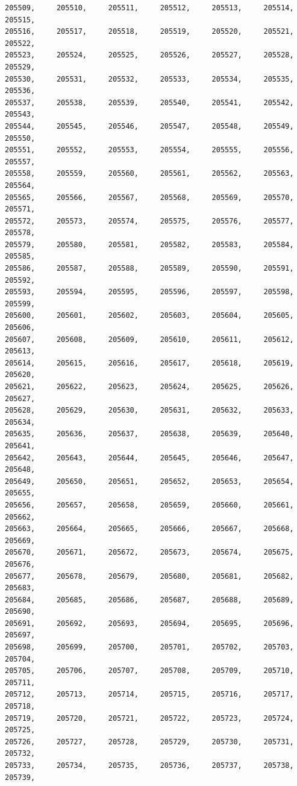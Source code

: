 \documentclass[a4paper,11pt]{report}
\begin{document}
\begin{verbatim}
205509,     205510,     205511,     205512,     205513,     205514,     205515,
205516,     205517,     205518,     205519,     205520,     205521,     205522,
205523,     205524,     205525,     205526,     205527,     205528,     205529,
205530,     205531,     205532,     205533,     205534,     205535,     205536,
205537,     205538,     205539,     205540,     205541,     205542,     205543,
205544,     205545,     205546,     205547,     205548,     205549,     205550,
205551,     205552,     205553,     205554,     205555,     205556,     205557,
205558,     205559,     205560,     205561,     205562,     205563,     205564,
205565,     205566,     205567,     205568,     205569,     205570,     205571,
205572,     205573,     205574,     205575,     205576,     205577,     205578,
205579,     205580,     205581,     205582,     205583,     205584,     205585,
205586,     205587,     205588,     205589,     205590,     205591,     205592,
205593,     205594,     205595,     205596,     205597,     205598,     205599,
205600,     205601,     205602,     205603,     205604,     205605,     205606,
205607,     205608,     205609,     205610,     205611,     205612,     205613,
205614,     205615,     205616,     205617,     205618,     205619,     205620,
205621,     205622,     205623,     205624,     205625,     205626,     205627,
205628,     205629,     205630,     205631,     205632,     205633,     205634,
205635,     205636,     205637,     205638,     205639,     205640,     205641,
205642,     205643,     205644,     205645,     205646,     205647,     205648,
205649,     205650,     205651,     205652,     205653,     205654,     205655,
205656,     205657,     205658,     205659,     205660,     205661,     205662,
205663,     205664,     205665,     205666,     205667,     205668,     205669,
205670,     205671,     205672,     205673,     205674,     205675,     205676,
205677,     205678,     205679,     205680,     205681,     205682,     205683,
205684,     205685,     205686,     205687,     205688,     205689,     205690,
205691,     205692,     205693,     205694,     205695,     205696,     205697,
205698,     205699,     205700,     205701,     205702,     205703,     205704,
205705,     205706,     205707,     205708,     205709,     205710,     205711,
205712,     205713,     205714,     205715,     205716,     205717,     205718,
205719,     205720,     205721,     205722,     205723,     205724,     205725,
205726,     205727,     205728,     205729,     205730,     205731,     205732,
205733,     205734,     205735,     205736,     205737,     205738,     205739,

\end{verbatim}
\end{document}
